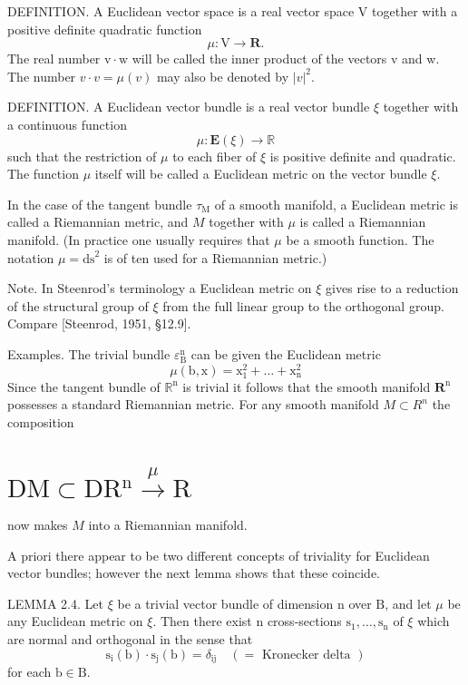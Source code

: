 \documentclass[10pt]{article}
\begin{document}
DEFINITION. A Euclidean vector space is a real vector space $\mathrm{V}$ together with a positive definite quadratic function
$$
\mu: \mathrm{V} \rightarrow \mathbf{R} .
$$
The real number $\mathrm{v} \cdot \mathrm{w}$ will be called the inner product of the vectors $\mathrm{v}$ and w. The number $v \cdot v=\mu(v)$ may also be denoted by $|v|^{2}$.

DEFINITION. A Euclidean vector bundle is a real vector bundle $\xi$ together with a continuous function
$$
\mu: \mathbf{E}(\xi) \rightarrow \mathbb{R}
$$
such that the restriction of $\mu$ to each fiber of $\xi$ is positive definite and quadratic. The function $\mu$ itself will be called a Euclidean metric on the vector bundle $\xi$.

In the case of the tangent bundle $\tau_{\mathrm{M}}$ of a smooth manifold, a Euclidean metric is called a Riemannian metric, and $M$ together with $\mu$ is called a Riemannian manifold. (In practice one usually requires that $\mu$ be a smooth function. The notation $\mu=\mathrm{ds}^{2}$ is of ten used for a Riemannian metric.)

Note. In Steenrod's terminology a Euclidean metric on $\xi$ gives rise to a reduction of the structural group of $\xi$ from the full linear group to the orthogonal group. Compare [Steenrod, 1951, §12.9].

Examples. The trivial bundle $\varepsilon_{\mathrm{B}}^{\mathrm{n}}$ can be given the Euclidean metric
$$
\mu(\mathrm{b}, \mathrm{x})=\mathrm{x}_{1}^{2}+\ldots+\mathrm{x}_{\mathrm{n}}^{2}
$$
Since the tangent bundle of $\mathbb{R}^{\mathrm{n}}$ is trivial it follows that the smooth manifold $\mathbf{R}^{\mathrm{n}}$ possesses a standard Riemannian metric. For any smooth manifold $M \subset R^{n}$ the composition

\section{$\mathrm{DM} \subset \mathrm{DR}{ }^{\mathrm{n}} \stackrel{\mu}{\longrightarrow} \mathrm{R}$}
now makes $M$ into a Riemannian manifold.

A priori there appear to be two different concepts of triviality for Euclidean vector bundles; however the next lemma shows that these coincide.

LEMMA 2.4. Let $\xi$ be a trivial vector bundle of dimension $\mathrm{n}$ over $\mathrm{B}$, and let $\mu$ be any Euclidean metric on $\xi$. Then there exist $\mathrm{n}$ cross-sections $\mathrm{s}_{1}, \ldots, \mathrm{s}_{\mathrm{n}}$ of $\xi$ which are normal and orthogonal in the sense that
$$
\mathrm{s}_{\mathrm{i}}(\mathrm{b}) \cdot \mathrm{s}_{\mathrm{j}}(\mathrm{b})=\delta_{\mathrm{ij}} \quad(=\text { Kronecker delta })
$$
for each $\mathrm{b} \in \mathrm{B}$.
\end{document}
